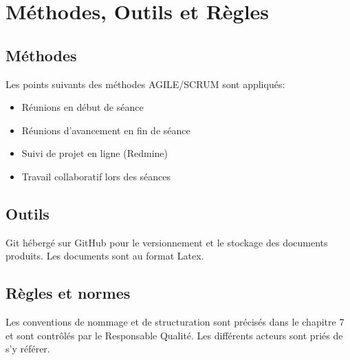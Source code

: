 \section{Méthodes, Outils et Règles}

\subsection{Méthodes}
Les points suivants des méthodes AGILE/SCRUM sont appliqués:
\begin{itemize}
\item Réunions en début de séance
\item Réunions d'avancement en fin de séance
\item Suivi de projet en ligne (Redmine)
\item Travail collaboratif lors des séances
\end{itemize}

\subsection{Outils}
Git hébergé sur GitHub pour le versionnement et le stockage
des documents produits. Les documents sont au format Latex.
\subsection{Règles et normes}
Les conventions de nommage et de structuration sont précisés dans le chapitre 
7 et sont contrôlés par le Responsable Qualité. 
Les différents acteurs sont priés de s'y référer.
\vfill
\pagebreak
